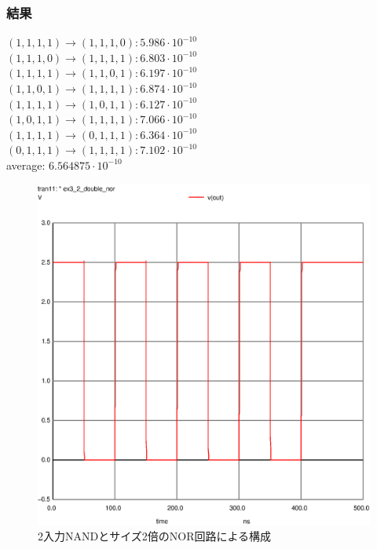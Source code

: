 \documentclass{jsarticle}
\begin{document}
\subsubsection{結果}
\begin{flushleft}
$(1,1,1,1) \rightarrow (1,1,1,0) : 5.986 \cdot 10^{-10}$\\
$(1,1,1,0) \rightarrow (1,1,1,1) : 6.803 \cdot 10^{-10}$\\
$(1,1,1,1) \rightarrow (1,1,0,1) : 6.197 \cdot 10^{-10}$\\
$(1,1,0,1) \rightarrow (1,1,1,1) : 6.874 \cdot 10^{-10}$\\
$(1,1,1,1) \rightarrow (1,0,1,1) : 6.127 \cdot 10^{-10}$\\
$(1,0,1,1) \rightarrow (1,1,1,1) : 7.066 \cdot 10^{-10}$\\
$(1,1,1,1) \rightarrow (0,1,1,1) : 6.364 \cdot 10^{-10}$\\
$(0,1,1,1) \rightarrow (1,1,1,1) : 7.102 \cdot 10^{-10}$\\
average: $6.564875 \cdot 10^{-10}$

\end{flushleft}
\begin{figure}[H]
    \hspace{50pt}
    \includegraphics[scale=0.8]{ex3_2_double_nor.ps}
    \vspace{30pt}
    \caption{2入力NANDとサイズ2倍のNOR回路による構成}
\end{figure}
\end{document}
